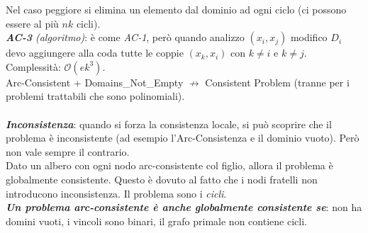 \documentclass[a4paper, notitlepage, 9pt]{extreport}
\begin{document}
Nel caso peggiore si elimina un elemento dal dominio ad ogni ciclo (ci possono essere al più $nk$ cicli).\\
\textit{\textbf{AC-3} (algoritmo)}: è come \textit{AC-1}, però quando analizzo $(x_i, x_j)$ modifico $D_i$ devo aggiungere alla coda tutte le coppie $(x_k, x_i)$ con $k\neq i$ e $k\neq j$. Complessità: $\mathcal{O}(ek^3)$.\\
Arc-Consistent + Domains\_Not\_Empty $\nrightarrow$ Consistent Problem (tranne per i problemi trattabili che sono polinomiali).\\\\
\textit{\textbf{Inconsistenza}}: quando si forza la consistenza locale, si può scoprire che il problema è inconsistente (ad esempio l'Arc-Consistenza e il dominio vuoto). Però non vale sempre il contrario.\\
Dato un albero con ogni nodo arc-consistente col figlio, allora il problema è globalmente consistente. Questo è dovuto al fatto che i nodi fratelli non introducono inconsistenza. Il problema sono i \textit{cicli}.\\
\textit{\textbf{Un problema arc-consistente è anche globalmente consistente se}}: non ha domini vuoti, i vincoli sono binari, il grafo primale non contiene cicli.
\end{document}
